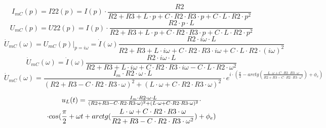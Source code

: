 \documentclass[a4paper,12pt]{article}
\begin{document}
$$I_{mC}(p)=I22(p)=I(p)\cdot \frac{R2}{R2+R3+L\cdot p+C\cdot R2\cdot R3\cdot p+C\cdot L\cdot R2\cdot p^2}$$
$$U_{mC}(p)=U22(p)=I(p)\cdot \frac{R2\cdot p\cdot L}{R2+R3+L\cdot p+C\cdot R2\cdot R3\cdot p+C\cdot L\cdot R2\cdot p^2}$$
$$\dot{U}_{mC}(\omega) = U_{mC}(p)\vert_{p=i\omega}=\dot{I}(\omega)\frac{R2\cdot i\omega\cdot L}{R2+R3+L\cdot {i\omega}+C\cdot R2\cdot R3\cdot {i\omega}+C\cdot L\cdot R2\cdot (i\omega)^2}$$
$$\dot{U}_{mC}(\omega) =\dot{I}(\omega)\frac{R2\cdot i\omega\cdot L}{R2+R3+L\cdot {i\omega}+C\cdot R2\cdot R3\cdot {i\omega}-C\cdot L\cdot R2\cdot \omega^2}$$
$$\dot{U}_{mC}(\omega) =\frac{I_m\cdot R2\cdot \omega\cdot L}{(R2+R3-C\cdot R2\cdot R3\cdot \omega)^2+(L\cdot \omega+C\cdot R2\cdot R3\cdot \omega)^2}\cdot e^{i\cdot (\frac{\pi}{2}-arctg(\frac{L\cdot \omega+C\cdot R2\cdot R3\cdot \omega}{R2+R3-C\cdot R2\cdot R3\cdot \omega^2})+\phi_e)}$$

\begin{multline}
$$u_{L}(t) =\frac{I_m\cdot R2\cdot \omega\cdot L}{(R2+R3-C\cdot R2\cdot R3\cdot \omega)^2+(L\cdot \omega+C\cdot R2\cdot R3\cdot \omega)^2}\cdot \\* \cdot cos(\frac{\pi}{2}+\omega t + arctg(\frac{L\cdot \omega+C\cdot R2\cdot R3\cdot \omega}{R2+R3-C\cdot R2\cdot R3\cdot \omega^2})+\phi_e)$$
\end{multline}
\end{document}
